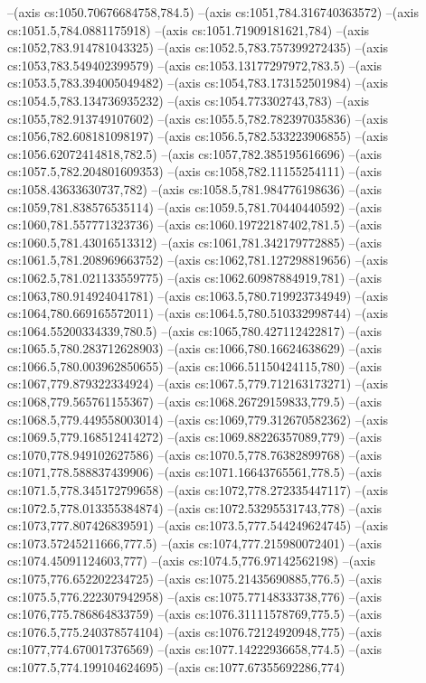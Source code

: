 --(axis cs:1050.70676684758,784.5)
--(axis cs:1051,784.316740363572)
--(axis cs:1051.5,784.0881175918)
--(axis cs:1051.71909181621,784)
--(axis cs:1052,783.914781043325)
--(axis cs:1052.5,783.757399272435)
--(axis cs:1053,783.549402399579)
--(axis cs:1053.13177297972,783.5)
--(axis cs:1053.5,783.394005049482)
--(axis cs:1054,783.173152501984)
--(axis cs:1054.5,783.134736935232)
--(axis cs:1054.773302743,783)
--(axis cs:1055,782.913749107602)
--(axis cs:1055.5,782.782397035836)
--(axis cs:1056,782.608181098197)
--(axis cs:1056.5,782.533223906855)
--(axis cs:1056.62072414818,782.5)
--(axis cs:1057,782.385195616696)
--(axis cs:1057.5,782.204801609353)
--(axis cs:1058,782.11155254111)
--(axis cs:1058.43633630737,782)
--(axis cs:1058.5,781.984776198636)
--(axis cs:1059,781.838576535114)
--(axis cs:1059.5,781.70440440592)
--(axis cs:1060,781.557771323736)
--(axis cs:1060.19722187402,781.5)
--(axis cs:1060.5,781.43016513312)
--(axis cs:1061,781.342179772885)
--(axis cs:1061.5,781.208969663752)
--(axis cs:1062,781.127298819656)
--(axis cs:1062.5,781.021133559775)
--(axis cs:1062.60987884919,781)
--(axis cs:1063,780.914924041781)
--(axis cs:1063.5,780.719923734949)
--(axis cs:1064,780.669165572011)
--(axis cs:1064.5,780.510332998744)
--(axis cs:1064.55200334339,780.5)
--(axis cs:1065,780.427112422817)
--(axis cs:1065.5,780.283712628903)
--(axis cs:1066,780.16624638629)
--(axis cs:1066.5,780.003962850655)
--(axis cs:1066.51150424115,780)
--(axis cs:1067,779.879322334924)
--(axis cs:1067.5,779.712163173271)
--(axis cs:1068,779.565761155367)
--(axis cs:1068.26729159833,779.5)
--(axis cs:1068.5,779.449558003014)
--(axis cs:1069,779.312670582362)
--(axis cs:1069.5,779.168512414272)
--(axis cs:1069.88226357089,779)
--(axis cs:1070,778.949102627586)
--(axis cs:1070.5,778.76382899768)
--(axis cs:1071,778.588837439906)
--(axis cs:1071.16643765561,778.5)
--(axis cs:1071.5,778.345172799658)
--(axis cs:1072,778.272335447117)
--(axis cs:1072.5,778.013355384874)
--(axis cs:1072.53295531743,778)
--(axis cs:1073,777.807426839591)
--(axis cs:1073.5,777.544249624745)
--(axis cs:1073.57245211666,777.5)
--(axis cs:1074,777.215980072401)
--(axis cs:1074.45091124603,777)
--(axis cs:1074.5,776.97142562198)
--(axis cs:1075,776.652202234725)
--(axis cs:1075.21435690885,776.5)
--(axis cs:1075.5,776.222307942958)
--(axis cs:1075.77148333738,776)
--(axis cs:1076,775.786864833759)
--(axis cs:1076.31111578769,775.5)
--(axis cs:1076.5,775.240378574104)
--(axis cs:1076.72124920948,775)
--(axis cs:1077,774.670017376569)
--(axis cs:1077.14222936658,774.5)
--(axis cs:1077.5,774.199104624695)
--(axis cs:1077.67355692286,774)
